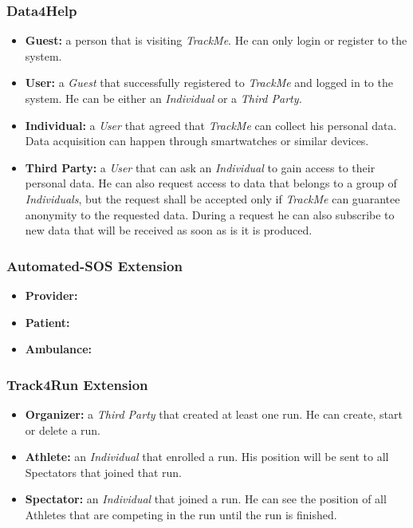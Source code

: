 \documentclass[a4paper]{article}
\begin{document}
        \subsubsection{Data4Help}
        \begin{itemize}
            \item \textbf{Guest:} a person that is visiting \textit{TrackMe}. He can only login or register to the system.
            \item \textbf{User:} a \textit{Guest} that successfully registered to \textit{TrackMe} and logged in to the system. He can be either an \textit{Individual} or a \textit{Third Party.}
            \item \textbf{Individual:} a \textit{User} that agreed that \textit{TrackMe} can collect his personal data. Data acquisition can happen through smartwatches or similar devices.
            \item \textbf{Third Party:} a \textit{User} that can ask an \textit{Individual} to gain access to their personal data. He can also request access to data that belongs to a group of \textit{Individuals}, but the request shall be accepted only if \textit{TrackMe} can guarantee anonymity to the requested data. During a request he can also subscribe to new data that will be received as soon as is it is produced.
        \end{itemize}
        
        \subsubsection{Automated-SOS Extension}
        \begin{itemize}
            \item \textbf{Provider:}
            \item \textbf{Patient:}
            \item \textbf{Ambulance:}
        \end{itemize}
        
        
        \subsubsection{Track4Run Extension}
        \begin{itemize}
            \item \textbf{Organizer:} a \textit{Third Party} that created at least one run. He can create, start or delete a run.
            \item \textbf{Athlete:} an \textit{Individual} that enrolled a run. His position will be sent to all Spectators that joined that run.
            \item \textbf{Spectator:} an \textit{Individual} that joined a run. He can see the position of all Athletes that are competing in the run until the run is finished.
        \end{itemize}
        
\end{document}
